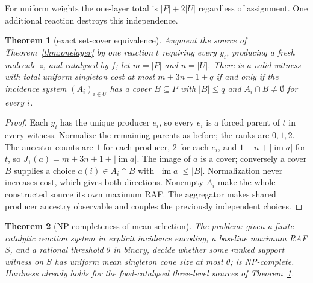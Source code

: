 \documentclass[11pt,a4paper]{article}
\theoremstyle{plain}
\newtheorem{theorem}{Theorem}[section]
\theoremstyle{definition}
\theoremstyle{remark}
\DeclareMathOperator{\im}{im}
\begin{document}
For uniform weights the one-layer total is $|P|+2|U|$ regardless of assignment. One additional reaction destroys this independence.

\begin{theorem}[exact set-cover equivalence]\label{thm:setcover}
Augment the source of Theorem~\ref{thm:onelayer} by one reaction $t$ requiring every $y_i$, producing a fresh molecule $z$, and catalysed by $f$; let $m=|P|$ and $n=|U|$. There is a valid witness with total uniform singleton cost at most $m+3n+1+q$ if and only if the incidence system $(A_i)_{i\in U}$ has a cover $B\subseteq P$ with $|B|\le q$ and $A_i\cap B\neq\emptyset$ for every $i$.
\end{theorem}

\begin{proof}
Each $y_i$ has the unique producer $e_i$, so every $e_i$ is a forced parent of $t$ in every witness. Normalize the remaining parents as before; the ranks are $0,1,2$. The ancestor counts are $1$ for each producer, $2$ for each $e_i$, and $1+n+|\im a|$ for $t$, so $J_1(a)=m+3n+1+|\im a|$. The image of $a$ is a cover; conversely a cover $B$ supplies a choice $a(i)\in A_i\cap B$ with $|\im a|\le|B|$. Normalization never increases cost, which gives both directions. Nonempty $A_i$ make the whole constructed source its own maximum RAF. The aggregator makes shared producer ancestry observable and couples the previously independent choices.
\end{proof}

\begin{theorem}[NP-completeness of mean selection]\label{thm:npc}
The problem: given a finite catalytic reaction system in explicit incidence encoding, a baseline maximum RAF $S$, and a rational threshold $\theta$ in binary, decide whether some ranked support witness on $S$ has uniform mean singleton cone size at most $\theta$; is NP-complete. Hardness already holds for the food-catalysed three-level sources of Theorem~\ref{thm:setcover}.
\end{theorem}
\end{document}
